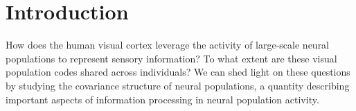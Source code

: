 \documentclass[10pt]{article}
\begin{document}

\section{Introduction}\label{introduction}

How does the human visual cortex leverage the activity of large-scale neural populations to represent sensory information? To what extent are these visual population codes shared across individuals? We can shed light on these questions by studying the covariance structure of neural populations, a quantity describing important aspects of information processing in neural population activity.
\end{document}
